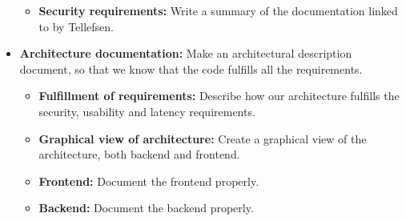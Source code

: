 \begin{itemize}
\begin{itemize}
\item{}\textbf{Security requirements:} Write a summary of the documentation linked to by Tellefsen.
\end{itemize}
\item{}\textbf{Architecture documentation:} Make an architectural description document, so that we know that the code fulfills all the requirements.
\begin{itemize}
\item{}\textbf{Fulfillment of requirements:} Describe how our architecture fulfills the security, usability and latency requirements.
\item{}\textbf{Graphical view of architecture:} Create a graphical view of the architecture, both backend and frontend.
\item{}\textbf{Frontend:} Document the frontend properly.
\item{}\textbf{Backend:} Document the backend properly.
\end{itemize}
\end{itemize}
